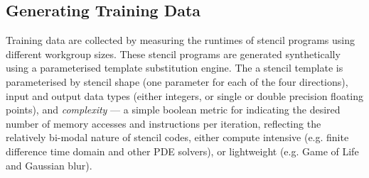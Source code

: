 \documentclass[nonatbib,preprint,10pt]{sigplanconf}
\begin{document}
\subsection{Generating Training Data}\label{subsec:training}


Training data are collected by measuring the runtimes of stencil
programs using different workgroup sizes. These stencil programs are
generated synthetically using a parameterised template substitution
engine. The a stencil template is parameterised by stencil shape (one
parameter for each of the four directions), input and output data
types (either integers, or single or double precision floating
points), and \emph{complexity} --- a simple boolean metric for
indicating the desired number of memory accesses and instructions per
iteration, reflecting the relatively bi-modal nature of stencil codes,
either compute intensive (e.g. finite difference time domain and other
PDE solvers), or lightweight (e.g. Game of Life and Gaussian blur).


\end{document}
